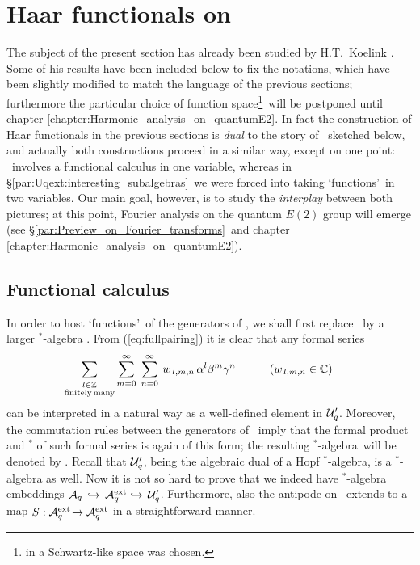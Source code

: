 

\section{Haar functionals on \protect\Aqext}
\label{par:Haar_functionals_on_Aqext}


\begin{abs_chp}
The subject of the present section has already been studied by \mbox{H.T.}\ Koelink
\cite{Koelink:thesis,Koelink:QE2}\@. Some of his results have been included
below to fix the notations, which have been slightly modified to match the
language of the previous sections; furthermore the particular choice of function
space\footnote{in \cite{Koelink:thesis,Koelink:QE2} a Schwartz-like space was chosen.}\
will be postponed until chapter \ref{chapter:Harmonic_analysis_on_quantumE2}\@.
In fact the construction of Haar functionals in the previous sections is {\em dual\/}
to the story of \cite{Koelink:thesis,Koelink:QE2}\ sketched below, and actually both
constructions proceed in a similar way, except on one point:
\cite{Koelink:thesis,Koelink:QE2}\ involves a functional
calculus in one variable, whereas in \S\ref{par:Uqext:interesting_subalgebras}\
we were forced into taking \lq functions\rq\ in two variables.
Our main goal, however, is to study the {\em interplay\/}
between both pictures; at this point, Fourier analysis on the quantum $E(2)$
group will emerge (see \S \ref{par:Preview_on_Fourier_transforms}\ and
chapter \ref{chapter:Harmonic_analysis_on_quantumE2}).
\end{abs_chp}



\subsection{Functional calculus}

In order to host \lq functions\rq\ of the generators of \Aq, we shall
first replace \Aq\ by a larger $^*$-algebra \Aqext\@.
From (\ref{eq:fullpairing}) it is clear that any formal series
\begin{equation} \label{eq:Aqext:formal_series}
   \sum_{\stackrel{\scriptstyle l\in\mathbb{Z}}{\rm finitely\, many}}
   \sum_{m=0}^{\infty} \;  \sum_{n=0}^{\infty} \:
     w_{\, l,m,n}\, \alpha^l \beta^m \gamma^n
   \hspace{3em}  (w_{\, l,m,n} \in \mathbb{C})
   \hspace{2em}
\end{equation}
can be interpreted in a natural way as a well-defined element in ${\mathcal U}_q'$.
Moreover, the commutation rules between the generators of \Aq\ imply that the
formal product and $^*$ of such formal series is again of this form;
the resulting \mbox{$^*$-algebra}\ will be denoted by \Aqext\@.
Recall that ${\mathcal U}_q'$, being the algebraic dual of a Hopf $^*$-algebra, is a $^*$-algebra as well.
Now it is not so hard to prove that we indeed have $^*$-algebra embeddings
${\mathcal A}_q \,\hookrightarrow \,{\mathcal A}_q^{\rm ext}\!\, \hookrightarrow\, {\mathcal U}_q'$.
Furthermore, also the antipode on \Aq\ extends to a map $S: {\mathcal A}_q^{\rm ext}\! \rightarrow {\mathcal A}_q^{\rm ext}\! \,$
in a straightforward manner.
\vspace{2ex}



